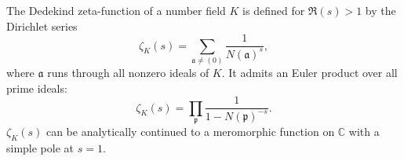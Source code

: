 The Dedekind zeta-function of a number field $K$ is defined for $\Re(s) > 1$ by the Dirichlet series
$$\zeta_K(s) = \sum_{\mathfrak{a} \neq (0)} \frac{1}{N(\mathfrak{a})^s},$$
where $\mathfrak{a}$ runs through all nonzero ideals of $K$. It admits an Euler product over all prime ideals:
$$\zeta_K(s) = \prod_{\mathfrak{p}} \frac{1}{1 - N(\mathfrak{p})^{-s}}.$$
$\zeta_K(s)$ can be analytically continued to a meromorphic function on $\mathbb{C}$ with a simple pole at $s=1$.
